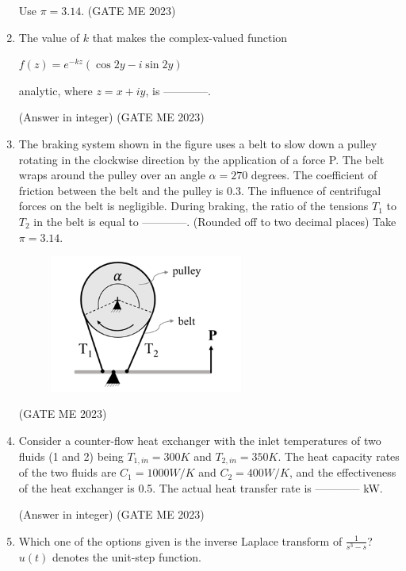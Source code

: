 \documentclass[journal]{IEEEtran}
\begin{document}
\begin{enumerate}
Use $ \pi = 3.14 $.
\hfill (GATE ME 2023)

\item The value of $k$ that makes the complex-valued function
\begin{center}
$ f(z) = e^{-kz} (\cos 2y - i \sin 2y) $
\end{center}
analytic, where $z = x + iy$, is ------------. 

(Answer in integer)
\hfill (GATE ME 2023)

\item The braking system shown in the figure uses a belt to slow down a pulley rotating in the clockwise direction by the application of a force P. The belt wraps around the pulley over an angle $\alpha = 270$ degrees. The coefficient of friction between the belt and the pulley is 0.3. The influence of centrifugal forces on the belt is negligible. During braking, the ratio of the tensions $T_1$ to $T_2$ in the belt is equal to ------------. (Rounded off to two decimal places) Take $ \pi = 3.14 $.
\begin{figure}[H]
\centering
\includegraphics[width=0.6\textwidth]{Fig 28.png}
\caption{}
\label{fig:question34}
\end{figure}
\hfill (GATE ME 2023)

\item Consider a counter-flow heat exchanger with the inlet temperatures of two fluids (1 and 2) being $T_{1, in} = 300  K$ and $T_{2, in} = 350  K$. The heat capacity rates of the two fluids are $C_1 = 1000  W/K$ and $C_2 = 400  W/K$, and the effectiveness of the heat exchanger is 0.5. The actual heat transfer rate is ------------ kW.

(Answer in integer)
\hfill (GATE ME 2023)

\item Which one of the options given is the inverse Laplace transform of $ \frac{1}{s^3 - s} $? $ u(t) $ denotes the unit-step function.


\end{enumerate}
\end{document}
